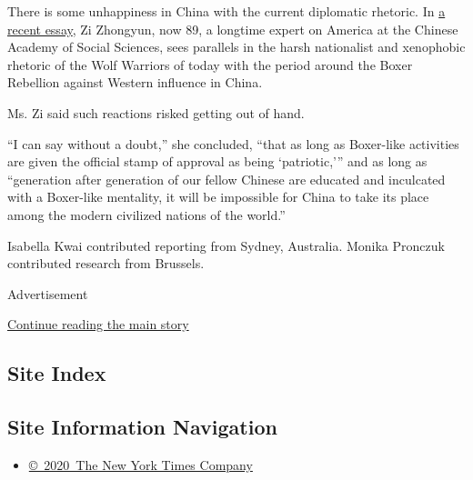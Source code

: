 There is some unhappiness in China with the current diplomatic rhetoric.
In
\href{http://chinaheritage.net/journal/1900-2020-an-old-anxiety-in-a-new-era/}{a
recent essay}, Zi Zhongyun, now 89, a longtime expert on America at the
Chinese Academy of Social Sciences, sees parallels in the harsh
nationalist and xenophobic rhetoric of the Wolf Warriors of today with
the period around the Boxer Rebellion against Western influence in
China.

Ms. Zi said such reactions risked getting out of hand.

``I can say without a doubt,'' she concluded, ``that as long as
Boxer-like activities are given the official stamp of approval as being
`patriotic,''' and as long as ``generation after generation of our
fellow Chinese are educated and inculcated with a Boxer-like mentality,
it will be impossible for China to take its place among the modern
civilized nations of the world.''

Isabella Kwai contributed reporting from Sydney, Australia. Monika
Pronczuk contributed research from Brussels.

Advertisement

\protect\hyperlink{after-bottom}{Continue reading the main story}

\hypertarget{site-index}{%
\subsection{Site Index}\label{site-index}}

\hypertarget{site-information-navigation}{%
\subsection{Site Information
Navigation}\label{site-information-navigation}}

\begin{itemize}
\tightlist
\item
  \href{https://help.nytimes.com/hc/en-us/articles/115014792127-Copyright-notice}{©~2020~The
  New York Times Company}
\end{itemize}

